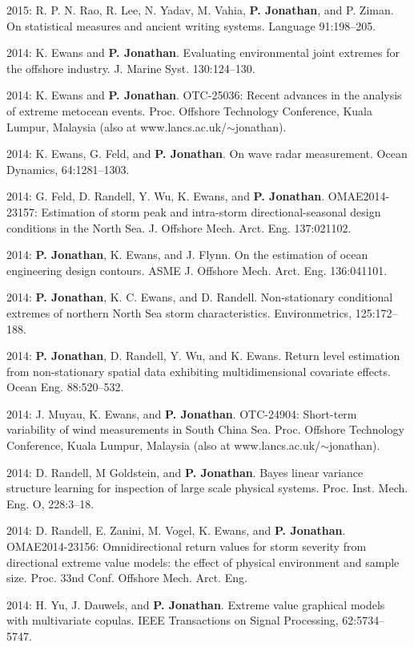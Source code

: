 \documentclass[11pt,a4paper]{moderncv}
\begin{document}
2015: R. P. N. Rao, R. Lee, N. Yadav, M. Vahia, \textbf{P. Jonathan}, and P. Ziman. On statistical measures and ancient writing systems. Language 91:198--205.

2014: K. Ewans and \textbf{P. Jonathan}. Evaluating environmental joint extremes for the offshore industry. J. Marine Syst. 130:124--130.

2014: K. Ewans and \textbf{P. Jonathan}. OTC-25036: Recent advances in the analysis of extreme metocean events. Proc. Offshore Technology Conference, Kuala Lumpur, Malaysia (also at www.lancs.ac.uk/$\sim$jonathan). 

2014: K. Ewans, G. Feld, and \textbf{P. Jonathan}. On wave radar measurement. Ocean Dynamics, 64:1281--1303. 

2014: G. Feld, D. Randell, Y. Wu, K. Ewans, and \textbf{P. Jonathan}. OMAE2014-23157: Estimation of storm peak and intra-storm directional-seasonal design conditions in the North Sea. J. Offshore Mech. Arct. Eng. 137:021102.

2014: \textbf{P. Jonathan}, K. Ewans, and J. Flynn. On the estimation of ocean engineering design contours. ASME J. Offshore Mech. Arct. Eng. 136:041101.

2014: \textbf{P. Jonathan}, K. C. Ewans, and D. Randell. Non-stationary conditional extremes of northern North Sea storm characteristics. Environmetrics, 125:172--188.

2014: \textbf{P. Jonathan}, D. Randell, Y. Wu, and K. Ewans. Return level estimation from non-stationary spatial data exhibiting multidimensional covariate effects. Ocean Eng. 88:520--532.

2014: J. Muyau, K. Ewans, and \textbf{P. Jonathan}. OTC-24904: Short-term variability of wind measurements in South China Sea. Proc. Offshore Technology Conference, Kuala Lumpur, Malaysia (also at www.lancs.ac.uk/$\sim$jonathan).

2014: D. Randell, M Goldstein, and \textbf{P. Jonathan}. Bayes linear variance structure learning for inspection of large scale physical systems. Proc. Inst. Mech. Eng. O, 228:3--18.

2014: D. Randell, E. Zanini, M. Vogel, K. Ewans, and \textbf{P. Jonathan}. OMAE2014-23156: Omnidirectional return values for storm severity from directional extreme value models: the effect of physical environment and sample size. Proc. 33nd Conf. Offshore Mech. Arct. Eng.

2014: H. Yu, J. Dauwels, and \textbf{P. Jonathan}. Extreme value graphical models with multivariate copulas. IEEE Transactions on Signal Processing, 62:5734--5747.
\end{document}
